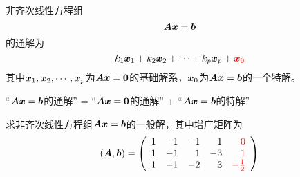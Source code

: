 \begin{frame}
非齐次线性方程组
$$\MA\vx=\vb$$
的通解为
$$
k_1\vx_1+k_2\vx_2+\cd+k_p\vx_p + \red{\vx_0}
$$
其中$\vx_1,\vx_2,\cd,\vx_p$为$\MA\vx=\M0$的基础解系，$\vx_0$为$\MA\vx=\vb$的一个特解。
\end{frame}

\begin{frame}
\begin{zhu}
  “$\MA\vx=\vb$的通解” =  “$\MA\vx=\M0$的通解” + “$\MA\vx=\vb$的特解”
\end{zhu}
\end{frame}

\begin{frame}
\begin{li}
  求非齐次线性方程组$\MA\vx=\vb$的一般解，其中增广矩阵为
  $$
  (\MA,\vb) = \left(
    \begin{array}{rrrrr}
      1&-1&-1& 1&\red{0}\\
      1&-1& 1&-3&\red{1}\\
      1&-1&-2& 3&\red{-\frac12}
    \end{array}
  \right)
  $$
\end{li}
\end{frame}

